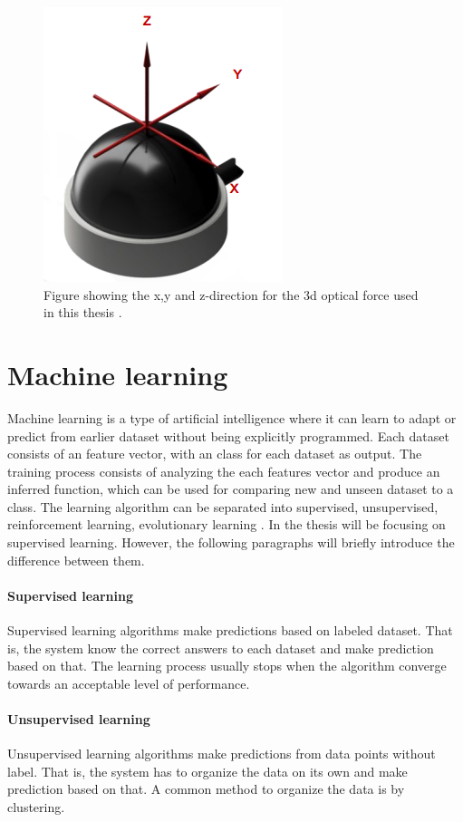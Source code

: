 \documentclass[USenglish]{ifimaster}  %
\begin{document}
\begin{figure}[h]
	\centering
	\includegraphics[scale=0.8]{Figures/OptoforceAxis3}
	\caption{Figure showing the x,y and z-direction for the 3d optical force used in this thesis \cite{OptoforceSheet}.}
	\label{fig:OptoforceAxis}
\end{figure}

\section {Machine learning}
Machine learning is a type of artificial intelligence where it can learn to adapt or predict from earlier dataset without being explicitly programmed. Each dataset consists of an feature vector, with an class for each dataset as output. The training process consists of analyzing the each features vector and produce an inferred function, which can be used for comparing new and unseen dataset to a class. The learning algorithm can be separated into supervised, unsupervised, reinforcement learning, evolutionary learning \cite{Marsland:2009:MLA:1571643}. In the thesis will be focusing on supervised learning. However, the following paragraphs will briefly introduce the difference between them.

\paragraph{Supervised learning}
Supervised learning algorithms make predictions based on labeled dataset. That is, the system know the correct answers to each dataset and make prediction based on that. The learning process usually stops when the algorithm converge towards an acceptable level of performance.

\paragraph{Unsupervised learning}
Unsupervised learning algorithms make predictions from data points without label. That is, the system has to organize the data on its own and make prediction based on that. A common method to organize the data is by clustering.
\end{document}
